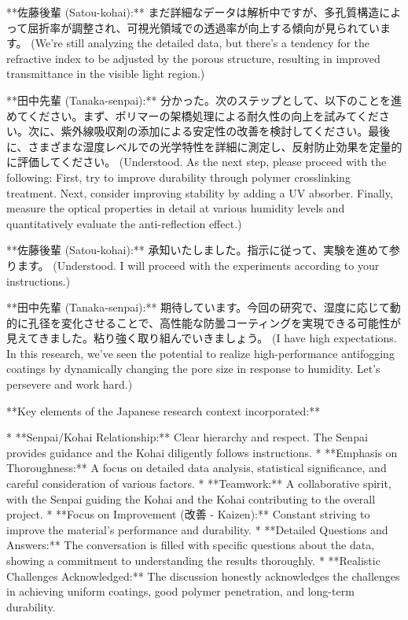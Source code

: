 \documentclass{article}
\begin{document}
**佐藤後輩 (Satou-kohai):** まだ詳細なデータは解析中ですが、多孔質構造によって屈折率が調整され、可視光領域での透過率が向上する傾向が見られています。 (We're still analyzing the detailed data, but there's a tendency for the refractive index to be adjusted by the porous structure, resulting in improved transmittance in the visible light region.)

**田中先輩 (Tanaka-senpai):** 分かった。次のステップとして、以下のことを進めてください。まず、ポリマーの架橋処理による耐久性の向上を試みてください。次に、紫外線吸収剤の添加による安定性の改善を検討してください。最後に、さまざまな湿度レベルでの光学特性を詳細に測定し、反射防止効果を定量的に評価してください。 (Understood. As the next step, please proceed with the following: First, try to improve durability through polymer crosslinking treatment. Next, consider improving stability by adding a UV absorber. Finally, measure the optical properties in detail at various humidity levels and quantitatively evaluate the anti-reflection effect.)

**佐藤後輩 (Satou-kohai):** 承知いたしました。指示に従って、実験を進めて参ります。 (Understood. I will proceed with the experiments according to your instructions.)

**田中先輩 (Tanaka-senpai):**  期待しています。今回の研究で、湿度に応じて動的に孔径を変化させることで、高性能な防曇コーティングを実現できる可能性が見えてきました。粘り強く取り組んでいきましょう。 (I have high expectations. In this research, we've seen the potential to realize high-performance antifogging coatings by dynamically changing the pore size in response to humidity. Let's persevere and work hard.)

**Key elements of the Japanese research context incorporated:**

*   **Senpai/Kohai Relationship:** Clear hierarchy and respect. The Senpai provides guidance and the Kohai diligently follows instructions.
*   **Emphasis on Thoroughness:** A focus on detailed data analysis, statistical significance, and careful consideration of various factors.
*   **Teamwork:** A collaborative spirit, with the Senpai guiding the Kohai and the Kohai contributing to the overall project.
*   **Focus on Improvement (改善 - Kaizen):** Constant striving to improve the material's performance and durability.
*   **Detailed Questions and Answers:** The conversation is filled with specific questions about the data, showing a commitment to understanding the results thoroughly.
*   **Realistic Challenges Acknowledged:** The discussion honestly acknowledges the challenges in achieving uniform coatings, good polymer penetration, and long-term durability.
\end{document}
